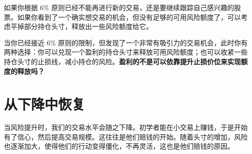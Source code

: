 如果你根据 6\% 原则已经不能再进行新的交易，还是要继续跟踪自己感兴趣的股票。如果你看到了一个确实想交易的机会，但没有足够的可用风险额度了，可以考虑平掉部分持仓头寸，释放出一些风险额度给它。

当你已经接近 6\% 原则的限制，但发现了一个非常有吸引力的交易机会，此时你有两种选择：你可以兑现一个盈利的持仓头寸来释放可用风险额度；也可以收紧一些持仓头寸的止损线，减小持仓的风险。\textbf{盈利的不是可以依靠提升止损价位来实现额度的释放吗？}
\section{从下降中恢复}
当风险提升时，我们的交易水平会随之下降。初学者能在小交易上赚钱，于是开始有了信心，然后提高交易规模。这往往是他们赔钱的开始。随着头寸的增加，风险也逐渐加大，使得他们的行动变得僵化，不再灵活，这也是他们赔钱的原因。